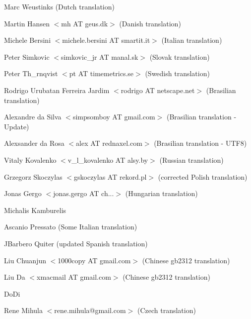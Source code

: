 \documentclass{report}
\begin{document}
\par
Marc Weustinks (Dutch translation)

\par
Martin Hansen {$<$}mh AT geus.dk{$>$} (Danish translation)

\par
Michele Bersini {$<$}michele.bersini AT smartit.it{$>$} (Italian translation)

\par
Peter Simkovic {$<$}simkovic{\_}jr AT manal.sk{$>$} (Slovak translation)

\par
Peter Th{\_}rnqvist {$<$}pt AT timemetrics.se{$>$} (Swedish translation)

\par
Rodrigo Urubatan Ferreira Jardim {$<$}rodrigo AT netscape.net{$>$} (Brasilian translation)

\par
Alexandre da Silva {$<$}simpsomboy AT gmail.com{$>$} (Brasilian translation - Update)

\par
Alexsander da Rosa {$<$}alex AT rednaxel.com{$>$} (Brasilian translation - UTF8)

\par
Vitaly Kovalenko {$<$}v{\_}l{\_}kovalenko AT alsy.by{$>$} (Russian translation)

\par
Grzegorz Skoczylas {$<$}gskoczylas AT rekord.pl{$>$} (corrected Polish translation)

\par
Jonas Gergo {$<$}jonas.gergo AT ch...{$>$} (Hungarian translation)

\par
Michalis Kamburelis

\par
Ascanio Pressato (Some Italian translation)

\par
JBarbero Quiter (updated Spanish translation)

\par
Liu Chuanjun {$<$}1000copy AT gmail.com{$>$} (Chinese gb2312 translation)

\par
Liu Da {$<$}xmacmail AT gmail.com{$>$} (Chinese gb2312 translation)

\par
DoDi

\par
Rene Mihula {$<$}rene.mihula@gmail.com{$>$} (Czech translation)
\end{document}
